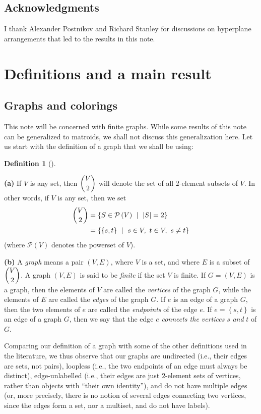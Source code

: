 \documentclass[numbers=enddot,12pt,final,onecolumn,notitlepage]{scrartcl}%
\theoremstyle{definition}
\newtheorem{defi}[theo]{Definition}
\newenvironment{definition}[1][]
{\begin{defi}[#1]\begin{leftbar}}
{\end{leftbar}\end{defi}}
\begin{document}
\subsection*{Acknowledgments}

I thank Alexander Postnikov and Richard Stanley for discussions on hyperplane
arrangements that led to the results in this note.

\section{Definitions and a main result}

\subsection{Graphs and colorings}

This note will be concerned with finite graphs. While some results of this
note can be generalized to matroids, we shall not discuss this generalization
here. Let us start with the definition of a graph that we shall be using:

\begin{definition}
\label{def.graph}\textbf{(a)} If $V$ is any set, then $\dbinom{V}{2}$ will
denote the set of all $2$-element subsets of $V$. In other words, if $V$ is
any set, then we set%
\begin{align*}
\dbinom{V}{2}  &  =\left\{  S\in\mathcal{P}\left(  V\right)  \ \mid
\ \left\vert S\right\vert =2\right\} \\
&  =\left\{  \left\{  s,t\right\}  \ \mid\ s\in V,\ t\in V,\ s\neq t\right\}
\end{align*}
(where $\mathcal{P}\left(  V\right)  $ denotes the powerset of $V$).

\textbf{(b)} A \textit{graph} means a pair $\left(  V,E\right)  $, where $V$
is a set, and where $E$ is a subset of $\dbinom{V}{2}$. A graph $\left(
V,E\right)  $ is said to be \textit{finite} if the set $V$ is finite. If
$G=\left(  V,E\right)  $ is a graph, then the elements of $V$ are called the
\textit{vertices} of the graph $G$, while the elements of $E$ are called the
\textit{edges} of the graph $G$. If $e$ is an edge of a graph $G$, then the
two elements of $e$ are called the \textit{endpoints} of the edge $e$. If
$e=\left\{  s,t\right\}  $ is an edge of a graph $G$, then we say that the
edge $e$ \textit{connects the vertices }$s$ \textit{and }$t$ of $G$.
\end{definition}

Comparing our definition of a graph with some of the other definitions used in
the literature, we thus observe that our graphs are undirected (i.e., their
edges are sets, not pairs), loopless (i.e., the two endpoints of an edge must
always be distinct), edge-unlabelled (i.e., their edges are just $2$-element
sets of vertices, rather than objects with \textquotedblleft their own
identity\textquotedblright), and do not have multiple edges (or, more
precisely, there is no notion of several edges connecting two vertices, since
the edges form a set, nor a multiset, and do not have labels).
\end{document}
